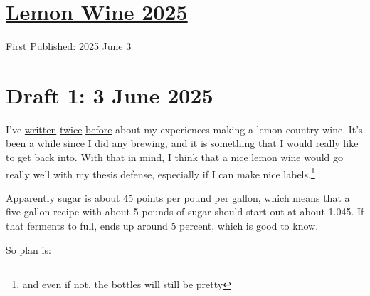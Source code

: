 \documentclass[12pt]{article}
\renewcommand{\,}{\textsuperscript{,}}
\begin{document}
  
\doublespacing  
\section{\href{lemon-wine-4.html}{Lemon Wine 2025}}  
First Published: 2025 June 3

\section{Draft 1: 3 June 2025}

I've \href{lemon-wine}{written} \href{lemon-wine-2}{twice} \href{lemon-wine-3}{before} about my experiences making a lemon country wine.  
It's been a while since I did any brewing, and it is something that I would really like to get back into.  
With that in mind, I think that a nice lemon wine would go really well with my thesis defense, especially if I can make nice labels.\footnote{and even if not, the bottles will still be pretty}

Apparently sugar is about 45 points per pound per gallon, which means that a five gallon recipe with about 5 pounds of sugar should start out at about 1.045.  
If that ferments to full, ends up around 5 percent, which is good to know.

So plan is:
\end{document}
